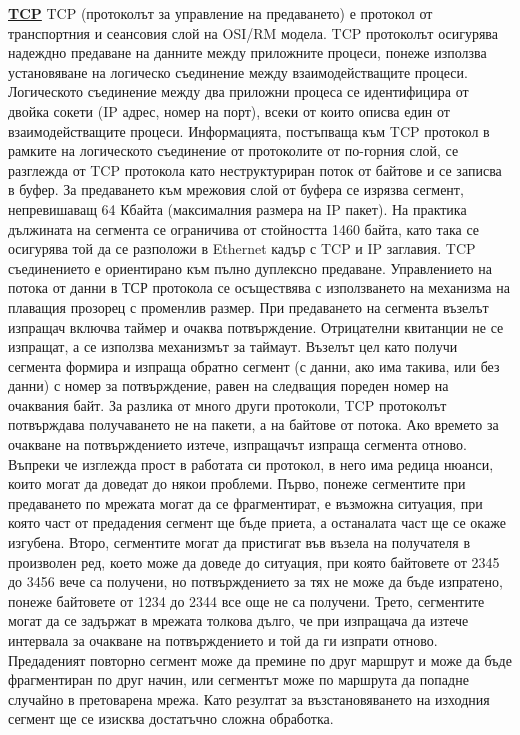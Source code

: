 \documentclass{article}
\begin{document}
\textbf{\underline{TCP}} \newline
TCP (протоколът за управление на предаването) е протокол от транспортния и сеансовия слой на OSI/RM модела. TCP протоколът
осигурява надеждно предаване на данните между приложните процеси, понеже използва установяване на логическо съединение между
взаимодействащите процеси. Логическото съединение между два приложни процеса се идентифицира от двойка сокети (IP адрес, номер на
порт), всеки от които описва един от взаимодействащите процеси.
Информацията, постъпваща към TCP протокол в рамките на логическото съединение от протоколите от по-горния слой, се разглежда от
TCP протокола като неструктуриран поток от байтове и се записва в буфер. За предаването към мрежовия слой от буфера се изрязва
сегмент, непревишаващ 64 Кбайта (максималния размера на IP пакет). На практика дължината на сегмента се ограничива от стойността
1460 байта, като така се осигурява той да се разположи в Ethernet кадър с TCP и IP заглавия.
TCP съединението е ориентирано към пълно дуплексно предаване. Управлението на потока от данни в ТСР протокола се осъществява с
използването на механизма на плаващия прозорец с променлив размер. При предаването на сегмента възелът изпращач включва таймер и
очаква потвърждение. Отрицателни квитанции не се изпращат, а се използва механизмът за таймаут. Възелът цел като получи сегмента
формира и изпраща обратно сегмент (с данни, ако има такива, или без данни) с номер за потвърждение, равен на следващия пореден
номер на очаквания байт. За разлика от много други протоколи, TCP протоколът потвърждава получаването не на пакети, а на байтове
от потока. Ако времето за очакване на потвърждението изтече, изпращачът изпраща сегмента отново.
Въпреки че изглежда прост в работата си протокол, в него има редица нюанси, които могат да доведат до някои проблеми. Първо,
понеже сегментите при предаването по мрежата могат да се фрагментират, е възможна ситуация, при която част от предадения сегмент
ще бъде приета, а останалата част ще се окаже изгубена. Второ, сегментите могат да пристигат във възела на получателя в
произволен ред, което може да доведе до ситуация, при която байтовете от 2345 до 3456 вече са получени, но потвърждението за тях
не може да бъде изпратено, понеже байтовете от 1234 до 2344 все още не са получени. Трето, сегментите могат да се задържат в
мрежата толкова дълго, че при изпращача да изтече интервала за очакване на потвърждението и той да ги изпрати отново. Предаденият
повторно сегмент може да премине по друг маршрут и може да бъде фрагментиран по друг начин, или сегментът може по маршрута да
попадне случайно в претоварена мрежа. Като резултат за възстановяването на изходния сегмент ще се изисква достатъчно сложна обработка.
\end{document}

